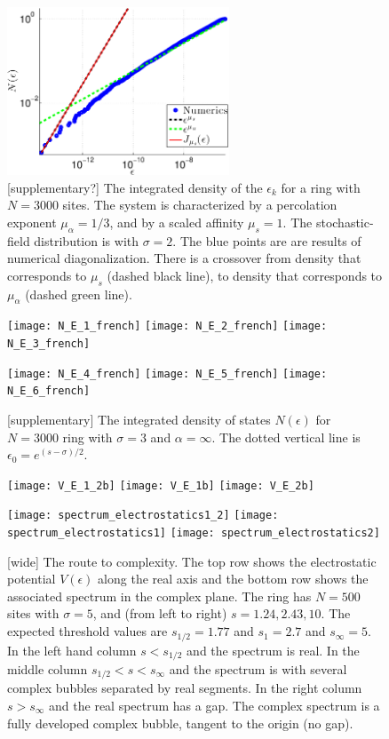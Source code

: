 \documentclass[aps,pre,floats,floatfix,twocolumn]{revtex4}
\newcommand{\rmrk}[1]{{\color[rgb]{0.6,0,0.1} #1}}
\begin{document}
\begin{figure}
\includegraphics[height=5cm]{N_E_1_1_french}

\caption{\label{fig2}\rmrk{[supplementary?]}
The integrated density of the $\epsilon_k$ for a ring with $N{=}3000$ sites. 
The system is characterized by a percolation exponent ${\mu_{\alpha} = 1/3}$, 
and by a scaled affinity ${\mu_s = 1}$. 
The stochastic-field distribution is with $\sigma{=}2$. 
The blue points are are results of numerical diagonalization. 
There is a crossover from density that corresponds to $\mu_s$ (dashed black line), 
to density that corresponds to $\mu_{\alpha}$ (dashed green line). 
}
\end{figure}


\begin{figure}
\texttt{[image: N\_E\_1\_french]}
\texttt{[image: N\_E\_2\_french]}
\texttt{[image: N\_E\_3\_french]}

\texttt{[image: N\_E\_4\_french]}
\texttt{[image: N\_E\_5\_french]}
\texttt{[image: N\_E\_6\_french]}

\caption{\rmrk{[supplementary]}
The integrated density of states $N(\epsilon)$ for $N{=}3000$ ring 
with $\sigma{=}3$ and $\alpha{=}\infty$. 
The dotted vertical line is ${\epsilon_0=e^{(s-\sigma)/2}}$.
}
\end{figure}



\begin{figure}
\texttt{[image: V\_E\_1\_2b]}
\texttt{[image: V\_E\_1b]}
\texttt{[image: V\_E\_2b]}

\texttt{[image: spectrum\_electrostatics1\_2]}
\texttt{[image: spectrum\_electrostatics1]}
\texttt{[image: spectrum\_electrostatics2]}

\caption{\label{f2} \rmrk{[wide]}
The route to complexity. 
The top row shows the electrostatic potential $V(\epsilon)$ along the real axis 
and the bottom row shows the associated spectrum in the complex plane. 
The ring has $N{=}500$ sites with $\sigma{=}5$, 
and (from left to right) ${s=1.24, 2.43, 10}$. 
The expected threshold values are ${s_{1/2}=1.77}$ and ${s_1=2.7}$ and ${s_{\infty}=5}$.
In the left hand column ${s<s_{1/2}}$ and the spectrum is real.
In the middle column ${s_{1/2} < s < s_{\infty}}$ and the spectrum is  
with several complex bubbles separated by real segments. 
In the right column  ${s>s_{\infty}}$ and the real spectrum has a gap.
The complex spectrum is a fully developed complex bubble, 
tangent to the origin (no gap). 
}
\end{figure}
\end{document}
